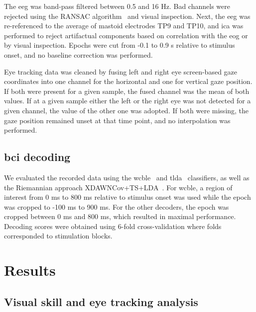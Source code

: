 \documentclass[twocolumn]{article}
\begin{document}
The \ac{eeg} was band-pass filtered between 0.5 and 16 Hz.
Bad channels were rejected using the RANSAC algorithm~\cite{Fischler1981}
and visual inspection.
Next, the \ac{eeg} was re-referenced to the average of mastoid electrodes TP9
and TP10, and \ac{ica} was performed to reject artifactual components based on
correlation with the \ac{eog} or by visual inspection.
Epochs were cut from -0.1 to 0.9 s relative to stimulus onset, and no baseline
correction was performed.

Eye tracking data was cleaned by fusing left and right eye screen-based gaze
coordinates into one channel for the horizontal and one for vertical gaze position.
If both were present for a given sample, the fused channel was the mean of both
values.
If at a given sample either the left or the right eye was not detected for a
given channel, the value of the other one was adopted.
If both were missing, the gaze position remained unset at that time point, and no
interpolation was performed.

\subsection{\Acs{bci} decoding}

We evaluated the recorded data using the \ac{wcble}~\cite{VanDenKerchove2024}
and \ac{tlda}~\cite{Sosulski2022}
classifiers, as well as the Riemannian approach XDAWNCov+TS+LDA~\cite{Cecotti2017}.
For \ac{wcble}, a region of interest from 0 ms to 800 ms relative to stimulus
onset was used while the epoch was cropped to -100 ms to 900 ms. For the other
decoders, the epoch was cropped between 0 ms and 800 ms, which resulted in maximal
performance.
Decoding scores were obtained using 6-fold cross-validation where folds corresponded to
stimulation blocks.

\section{Results}



\subsection{Visual skill and eye tracking analysis}
\label{sec:patients/outcomes/gaze}
\end{document}
